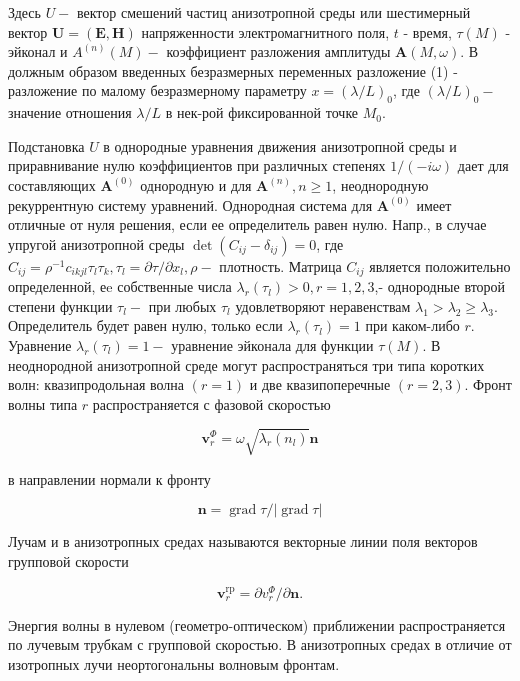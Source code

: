 \documentclass[10pt]{article}
\begin{document}
Здесь $U-$ вектор смешений частиц анизотропной среды или шестимерный вектор $\boldsymbol{U}=(\boldsymbol{E}, \boldsymbol{H})$ напряженности электромагнитного поля, $t$ - время, $\tau(M)$ - эйконал и $A^{(n)}(M)-$ коэффициент разложения амплитуды $\boldsymbol{A}(M, \omega)$. В должным образом введенных безразмерных переменных разложение (1) - разложение по малому безразмерному параметру $x=(\lambda / L)_{0}$, где $(\lambda / L)_{0}-$ значение отношения $\lambda / L$ в нек-рой фиксированной точке $M_{0}$.



Подстановка $U$ в однородные уравнения движения анизотропной среды и приравнивание нулю коэффициентов при различных степенях $1 /(-i \omega)$ дает для составляющих $\boldsymbol{A}^{(0)}$ однородную и для $\boldsymbol{A}^{(n)}, n \geqslant 1$, неоднородную рекуррентную систему уравнений. Однородная система для $\boldsymbol{A}^{(0)}$ имеет отличные от нуля решения, если ее определитель равен нулю. Напр., в случае упругой анизотропной среды $\operatorname{det}\left(C_{i j}-\delta_{i j}\right)=0$, где $C_{i j}=\rho^{-1} c_{i k j l} \tau_{l} \tau_{k}, \tau_{l}=\partial \tau / \partial x_{l}, \rho-$ плотность. Матрица $C_{i j}$ является положительно определенной, еe собственные числа $\lambda_{r}\left(\tau_{l}\right)>0, r=1,2,3$,- однородные второй степени функции $\tau_{l}-$ при любых $\tau_{l}$ удовлетворяют неравенствам $\lambda_{1}>\lambda_{2} \geqslant \lambda_{3}$. Определитель будет равен нулю, только если $\lambda_{r}\left(\tau_{l}\right)=1$ при каком-либо $r$. Уравнение $\lambda_{r}\left(\tau_{l}\right)=1-$ уравнение эйконала для функции $\tau(M)$. В неоднородной анизотропной среде могут распространяться три типа коротких волн: квазипродольная волна $(r=1)$ и две квазипоперечные $(r=2,3)$. Фронт волны типа $r$ распространяется с фазовой скоростью



\[

\boldsymbol{v}_{r}^{\Phi}=\omega \sqrt{\lambda_{r}\left(n_{l}\right)} \boldsymbol{n}

\]



в направлении нормали к фронту



\[

\boldsymbol{n}=\operatorname{grad} \tau /|\operatorname{grad} \tau|

\]



Лучам и в анизотропных средах называются векторные линии поля векторов групповой скорости



\[

\boldsymbol{v}_{r}^{\mathrm{rp}}=\partial v_{r}^{\Phi} / \partial \boldsymbol{n} .

\]



Энергия волны в нулевом (геометро-оптическом) приближении распространяется по лучевым трубкам с групповой скоростью. В анизотропных средах в отличие от изотропных лучи неортогональны волновым фронтам.
\end{document}
